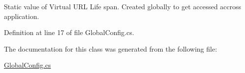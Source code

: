 Static value of Virtual U\+RL Life span. Created globally to get accessed accross application. 



Definition at line 17 of file Global\+Config.\+cs.



The documentation for this class was generated from the following file\+:\begin{DoxyCompactItemize}
\item 
\mbox{\hyperlink{_global_config_8cs}{Global\+Config.\+cs}}\end{DoxyCompactItemize}
